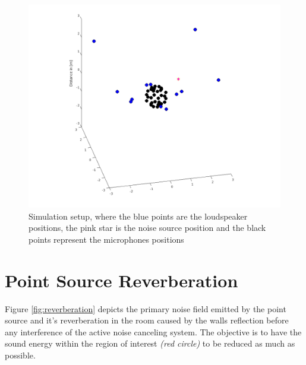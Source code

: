\begin{figure}[H]
    \centerline{\includegraphics[width=180mm,keepaspectratio]{LaTeX/images/plots/ANCSetup.png}}
    \caption{Simulation setup, where the blue points are the loudspeaker positions, the pink star is the noise source position and the black points represent the microphones positions}
    \label{fig:setup}
\end{figure}

\section{Point Source Reverberation}
Figure \ref{fig:reverberation} depicts the primary noise field emitted by the point source and it's reverberation in the room caused by the walls reflection before any interference of the active noise canceling system. The objective is to have the sound energy within the region of interest \textit{(red circle)} to be reduced as much as possible.

